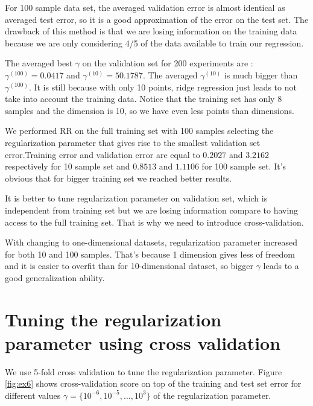 \documentclass{article} %
\begin{document}
For 100 sample data set, the averaged validation error is almost identical as averaged test error, so it is a good approximation of the error on the test set. The drawback of this method is that we are losing information on the training data because we are only considering 4/5 of the data available to train our regression. 

The averaged best $\gamma$ on the validation set for 200 experiments are : $\gamma^{(100)} = 0.0417 $ and  $\gamma^{(10)} = 50.1787$. The averaged  $\gamma^{(10)}$ is much bigger than  $\gamma^{(100)}$. It is still because with only 10 points, ridge regression just leads to not take into account the training data. Notice that the training set has only 8 samples and the dimension is 10, so we have even less points than dimensions.

We performed RR on the full training set with 100 samples selecting the regularization parameter that gives rise to the smallest validation set error.Training error and validation error are equal to $0.2027$ and $3.2162$ respectively for 10 sample set and   $0.8513$ and $1.1106$  for 100 sample set. It's obvious that for bigger training set we reached better results.

It is better to tune regularization parameter on validation set, which is independent from training set but we are losing information compare to having access to the full training set. That is why we need to introduce cross-validation. 

With changing to one-dimensional datasets, regularization parameter increased for both 10 and 100 samples. That's because 1 dimension gives less of freedom  and it is easier to overfit than for 10-dimensional dataset, so bigger $\gamma$ leads to a good generalization ability.

\section{Tuning the regularization parameter using cross validation}
We use 5-fold cross validation to tune the regularization parameter. Figure \ref{fig:ex6} shows cross-validation score on top of the training and test set error for different values $\gamma = \{10^{-6}, 10^{-5}, \dots, 10^3 \}$ of the regularization parameter.
\end{document}
